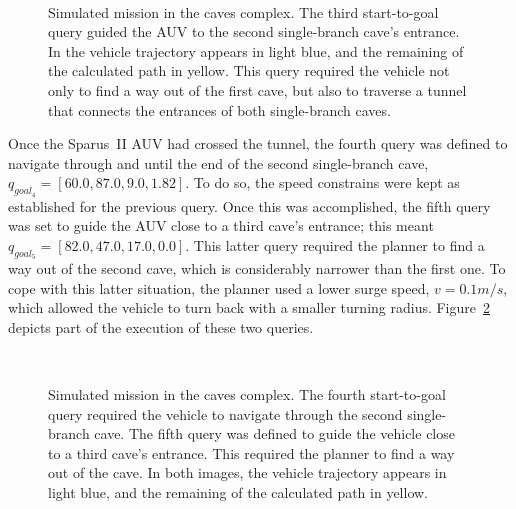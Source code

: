 \begin{figure}[htbp]
\myfloatalign
	\\
\caption[Simulated mission in the caves complex. Third start-to-goal query.]
{Simulated mission in the caves complex. The third start-to-goal query guided
the \ac{AUV} to the second single-branch cave's entrance. In \protect
{} the vehicle trajectory appears in light blue,
and the remaining of the calculated path in yellow. This query required the
vehicle not only to find a way out of the first cave, but also to traverse a
tunnel that connects the entrances of both single-branch caves.}
\label{fig:CavesMultS2G_Q3}
\end{figure}

Once the Sparus~II \ac{AUV} had crossed the tunnel, the fourth query was defined
to navigate through and until the end of the second single-branch cave, \ie
$q_{goal_4} = [60.0, 87.0, 9.0, 1.82]$. To do so, the speed constrains were kept
as established for the previous query. Once this was accomplished, the fifth
query was set to guide the \ac{AUV} close to a third cave's entrance; this meant
$q_{goal_5} = [82.0, 47.0, 17.0, 0.0]$. This latter query required the planner
to find a way out of the second cave, which is considerably narrower than the
first one. To cope with this latter situation, the planner used a lower surge
speed, $v=0.1m/s$, which allowed the vehicle to turn back with a smaller turning
radius. Figure~\ref{fig:CavesMultS2G_Q4_Q5} depicts part of the execution of
these two queries.

\begin{figure}[htbp]
\myfloatalign
	\\
\caption[Simulated mission in the caves complex. Fourth and fifth start-to-goal
queries.] 
{Simulated mission in the caves complex.
\protect {} The fourth start-to-goal query
required the vehicle to navigate through the second single-branch cave. 
\protect {} The fifth query was defined to guide
the vehicle close to a third cave's entrance. This required the planner to find
a way out of the cave. In both images, the vehicle trajectory appears in light
blue, and the remaining of the calculated path in yellow.}
\label{fig:CavesMultS2G_Q4_Q5}
\end{figure}

